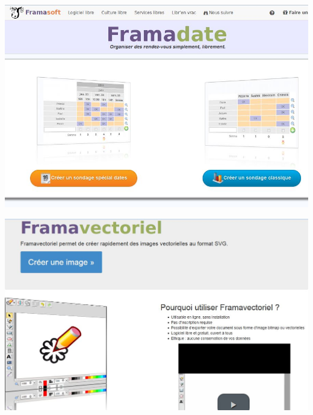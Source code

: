 \documentclass{beamer}
\begin{document}
\begin{frame}
\begin{center}
\includegraphics[scale=0.4]{./images/Framadate.jpg}
\end{center}
\end{frame}

\begin{frame}
\begin{center}
\includegraphics[scale=0.4]{./images/Framavectoriel.jpg}
\end{center}
\end{frame}
\end{document}
